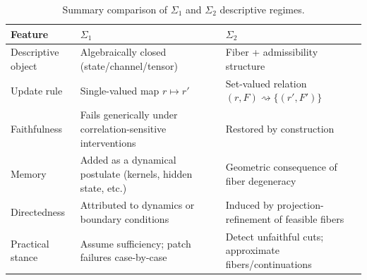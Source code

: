 \begin{table}[t]
\centering
\begin{tabular}{lll}
\toprule
Feature & $\Sigma_1$ & $\Sigma_2$ \\
\midrule
Descriptive object &
Algebraically closed (state/channel/tensor) &
Fiber + admissibility structure \\

Update rule &
Single-valued map $r\mapsto r'$ &
Set-valued relation $(r,F)\rightsquigarrow \{(r',F')\}$ \\

Faithfulness &
Fails generically under correlation-sensitive interventions &
Restored by construction \\

Memory &
Added as a dynamical postulate (kernels, hidden state, etc.) &
Geometric consequence of fiber degeneracy \\

Directedness &
Attributed to dynamics or boundary conditions &
Induced by projection-refinement of feasible fibers \\

Practical stance &
Assume sufficiency; patch failures case-by-case &
Detect unfaithful cuts; approximate fibers/continuations \\
\bottomrule
\end{tabular}
\caption{Summary comparison of $\Sigma_1$ and $\Sigma_2$ descriptive regimes.}
\label{tab:sigma1-vs-sigma2}
\end{table}